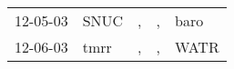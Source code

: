 \begin{supertabular}{lllll}
 12-05-03 &  SNUC &  , &  , &  baro \\
 12-06-03 &  tmrr &  , &  , &  WATR \\
\end{supertabular}
